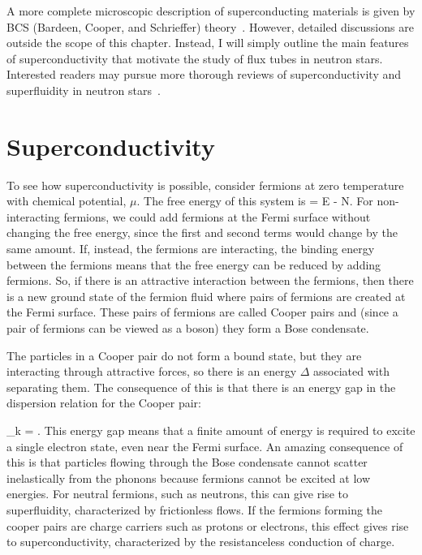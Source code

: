 A more complete microscopic description of superconducting materials is given by 
BCS (Bardeen, Cooper, and Schrieffer) theory~\cite{PhysRev.108.1175}. 
However, detailed discussions 
are outside the scope of this chapter. Instead, I will simply outline the main 
features of superconductivity that motivate the study of flux tubes in neutron 
stars. Interested readers may pursue more thorough reviews of superconductivity 
and superfluidity in neutron stars~\cite{2006pfsb.book..135S, schmitt2010dense}.

\section{Superconductivity}


To see how superconductivity is possible, 
consider fermions at zero temperature with chemical potential, $\mu$. The
free energy of this system is 
\be
	\Omega = E - \mu N.
\ee
For non-interacting fermions, we could add fermions at the Fermi surface 
without changing the free energy, since the first and second terms would 
change by the same amount. If, instead, the fermions are interacting, 
the binding energy between the fermions means that the free energy can 
be reduced by adding fermions. So, if there is an attractive interaction 
between the fermions, then there is a new ground state of the fermion fluid
where pairs of fermions are created at the Fermi surface. These pairs of 
fermions are called Cooper pairs and (since a pair of fermions can be viewed 
as a boson) they form a Bose condensate.

The particles in a Cooper pair do not form a bound state, but they are interacting 
through attractive forces, so there is an energy $\Delta$ associated with 
separating them. The consequence of this is that there is an energy gap in 
the dispersion relation for the Cooper pair:

\be
	\epsilon_k = .
\ee
This energy gap means that a finite amount of energy is required to 
excite a single electron state, even near the Fermi surface. 
An amazing consequence of this is that particles flowing through 
the Bose condensate cannot scatter inelastically 
from the phonons because 
fermions cannot be excited at low energies. For neutral fermions, 
such as neutrons, this can give rise to superfluidity, characterized by 
frictionless flows. If the fermions forming 
the cooper pairs are charge carriers such as protons or electrons, 
this effect gives rise to superconductivity, characterized by the 
resistanceless conduction of charge. 

